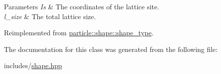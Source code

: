 \begin{DoxyParams}{Parameters}
{\em Is} & The coordinates of the lattice site. \\
\hline
{\em l\+\_\+size} & The total lattice size. \\
\hline
\end{DoxyParams}


Reimplemented from \hyperlink{classparticle_1_1shape_1_1shape__type_a64d04f49c8da656d8b8899c431c346fc}{particle\+::shape\+::shape\+\_\+type}.



The documentation for this class was generated from the following file\+:\begin{DoxyCompactItemize}
\item 
includes/\hyperlink{shape_8hpp}{shape.\+hpp}\end{DoxyCompactItemize}
